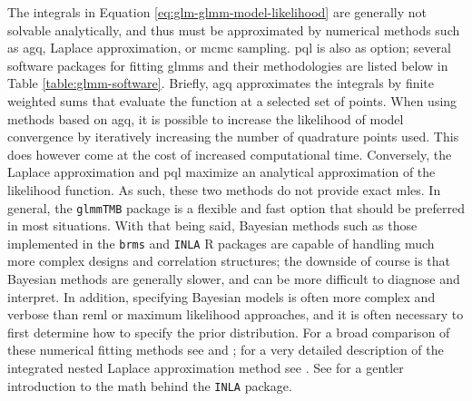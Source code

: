\documentclass{report}
\begin{document}
The integrals in Equation \ref{eq:glm-glmm-model-likelihood} are generally not solvable analytically, and thus must be approximated by numerical methods such as \gls{agq}, Laplace approximation, or \gls{mcmc} sampling. \Gls{pql} is also as option; several software packages for fitting \glspl{glmm} and their methodologies are listed below in Table \ref{table:glmm-software}. Briefly, \gls{agq} approximates the integrals by finite weighted sums that evaluate the function at a selected set of points. When using methods based on \gls{agq}, it is possible to increase the likelihood of model convergence by iteratively increasing the number of quadrature points used. This does however come at the cost of increased computational time. Conversely, the Laplace approximation and \gls{pql} maximize an analytical approximation of the likelihood function. As such, these two methods do not provide exact \glspl{mle}. In general, the \texttt{glmmTMB} package is a flexible and fast option that should be preferred in most situations. With that being said, Bayesian methods such as those implemented in the \texttt{brms} and \texttt{INLA} R packages are capable of handling much more complex designs and correlation structures; the downside of course is that Bayesian methods are generally slower, and can be more difficult to diagnose and interpret. In addition, specifying Bayesian models is often more complex and verbose than \gls{reml} or maximum likelihood approaches, and it is often necessary to first determine how to specify the prior distribution. For a broad comparison of these numerical fitting methods see \cite[Chapter~9.5.2-3]{agresti_foundations_2015} and \cite[Chapter~13.5]{faraway_extending_2016}; for a very detailed description of the integrated nested Laplace approximation method see \cite{rue_approximate_2009}. See \cite{morrison_gentle_2017} for a gentler introduction to the math behind the \texttt{INLA} package. 
\end{document}
